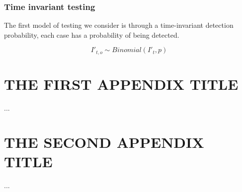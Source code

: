 \documentclass{umassthesis}          %
\begin{document}
\subsection{Time invariant testing}

The first model of testing we consider is through a time-invariant detection probability, each case has a probability of being detected. 

\begin{equation}
I'_{t,o} \sim Binomial(I'_t,p)	
\end{equation}



\appendix
\chapter{THE FIRST APPENDIX TITLE}
...
\chapter{THE SECOND APPENDIX TITLE}
...

\backmatter  %




\end{document}
